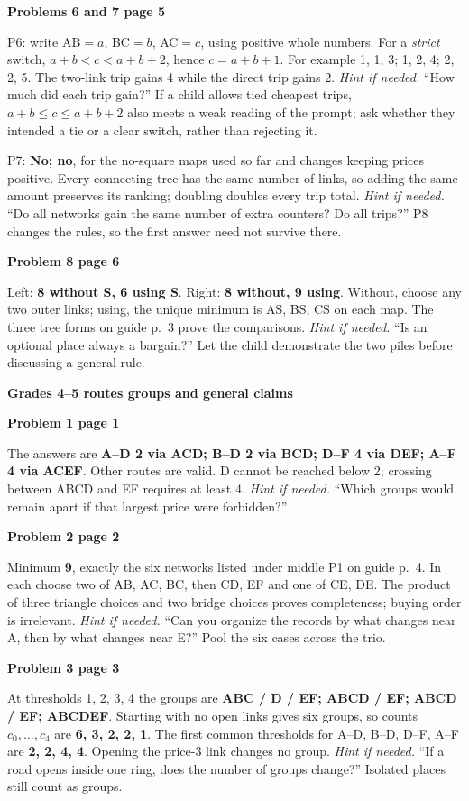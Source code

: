 \documentclass[11pt]{article}
\newcommand{\head}[1]{\par{\large\bfseries #1}\par}
\newcommand{\sub}[1]{\par\textbf{#1}\par}
\newcommand{\hint}[1]{\textit{Hint if needed.} #1}
\begin{document}
\sub{Problems 6 and 7 page 5}
P6: write AB$=a$, BC$=b$, AC$=c$, using positive whole numbers. For a \emph{strict} switch, $a+b<c<a+b+2$, hence \textbf{$c=a+b+1$}. For example 1, 1, 3; 1, 2, 4; 2, 2, 5. The two-link trip gains 4 while the direct trip gains 2. \hint{``How much did each trip gain?''} If a child allows tied cheapest trips, $a+b\le c\le a+b+2$ also meets a weak reading of the prompt; ask whether they intended a tie or a clear switch, rather than rejecting it.

P7: \textbf{No; no}, for the no-square maps used so far and changes keeping prices positive. Every connecting tree has the same number of links, so adding the same amount preserves its ranking; doubling doubles every trip total. \hint{``Do all networks gain the same number of extra counters? Do all trips?''} P8 changes the rules, so the first answer need not survive there.

\sub{Problem 8 page 6}
Left: \textbf{8 without S, 6 using S}. Right: \textbf{8 without, 9 using}. Without, choose any two outer links; using, the unique minimum is AS, BS, CS on each map. The three tree forms on guide p.~3 prove the comparisons. \hint{``Is an optional place always a bargain?''} Let the child demonstrate the two piles before discussing a general rule.
\newpage
\head{Grades 4--5 routes groups and general claims}
\sub{Problem 1 page 1}
The answers are \textbf{A--D 2 via ACD; B--D 2 via BCD; D--F 4 via DEF; A--F 4 via ACEF}. Other routes are valid. D cannot be reached below 2; crossing between ABCD and EF requires at least 4. \hint{``Which groups would remain apart if that largest price were forbidden?''}

\sub{Problem 2 page 2}
Minimum \textbf{9}, exactly the six networks listed under middle P1 on guide p.~4. In each choose two of AB, AC, BC, then CD, EF and one of CE, DE. The product of three triangle choices and two bridge choices proves completeness; buying order is irrelevant. \hint{``Can you organize the records by what changes near A, then by what changes near E?''} Pool the six cases across the trio.

\sub{Problem 3 page 3}
At thresholds 1, 2, 3, 4 the groups are \textbf{ABC / D / EF; ABCD / EF; ABCD / EF; ABCDEF}. Starting with no open links gives six groups, so counts $c_0,\ldots,c_4$ are \textbf{6, 3, 2, 2, 1}. The first common thresholds for A--D, B--D, D--F, A--F are \textbf{2, 2, 4, 4}. Opening the price-3 link changes no group. \hint{``If a road opens inside one ring, does the number of groups change?''} Isolated places still count as groups.
\end{document}
